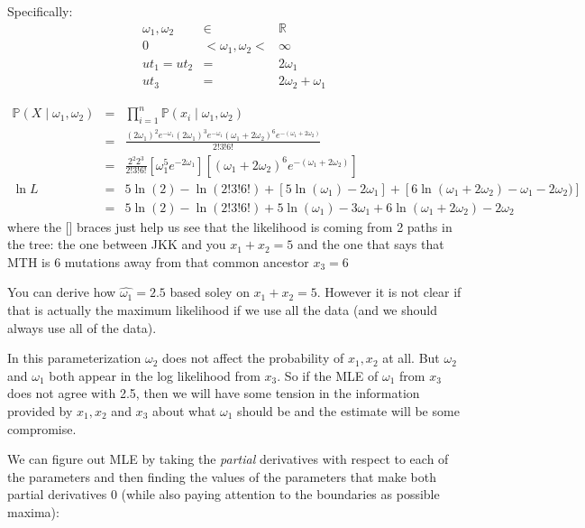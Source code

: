 \documentclass[11pt]{article}
\renewcommand{\Pr}{\mathbb{P}}
\begin{document}
Specifically:
\begin{eqnarray}
    \omega_1, \omega_2 & \in &  \mathbb{R}\\
    0 & < \omega_1, \omega_2 < & \infty\\
     ut_1 = ut_2 & = & 2\omega_1  \\
    ut_3 &= & 2\omega_2 + \omega_1
\end{eqnarray}


\begin{eqnarray}
\Pr(X\mid \omega_1,\omega_2)& = & \prod_{i=1}^{n} \Pr(x_i\mid \omega_1,\omega_2)\\
& = &
 \frac{(2\omega_1)^2e^{-\omega_1}(2\omega_1)^3e^{-\omega_1}\left(\omega_1+2\omega_2\right)^6e^{-(\omega_1+2\omega_2)}}{2!3!6!} \\
& = & \frac{2^2 2^3}{2!3!6!}\left[\omega_1^5e^{-2\omega_1}\right]
\left[\left(\omega_1+2\omega_2\right)^6e^{-(\omega_1+2\omega_2)}\right] \\
\ln L & = & 5\ln(2)-\ln(2!3!6!)+ \left[5 \ln(\omega_1) -2\omega_1\right] +
\left[6\ln\left(\omega_1+2\omega_2\right) -\omega_1- 2\omega_2)\right] \\
& = & 5\ln(2)-\ln(2!3!6!)+ 5 \ln(\omega_1) -3\omega_1 +
6\ln\left(\omega_1+2\omega_2\right) - 2\omega_2
\end{eqnarray}
where the [] braces just help us see that the likelihood is coming from 2 paths in the tree: the one between JKK and you $x_1+x_2 = 5$ and the one that says that MTH
is 6 mutations away from that common ancestor $x_3 = 6$

You can derive how $\hat{\omega_1}=2.5$ based soley on $x_1+x_2 = 5$.
However it is not clear if that is actually the maximum likelihood
if we use all the data (and we should always use all of the data).

In this parameterization $\omega_2$ does not affect the probability of $x_1, x_2$ at 
all. 
But $\omega_2$ and $\omega_1$ both appear in the log likelihood from $x_3$.
So if the MLE of $\omega_1$ from $x_3$ does not agree with 2.5, then we 
    will have some tension in the information provided by $x_1, x_2$
    and $x_3$ about what $\omega_1$ should be and the estimate will be 
    some compromise.

We can figure out MLE by taking the {\em partial} derivatives with
    respect to each of the parameters and then
    finding the values of the parameters that make
    both partial derivatives 0 (while also paying attention to
    the boundaries as possible maxima):
\end{document}
